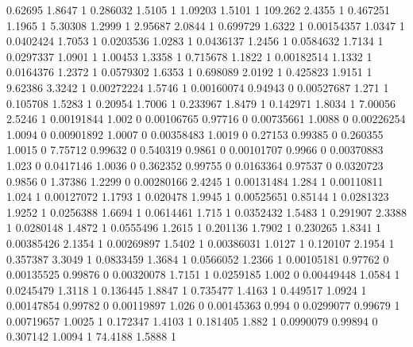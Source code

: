 {0.62695 1.8647 1
0.286032 1.5105 1
1.09203 1.5101 1
109.262 2.4355 1
0.467251 1.1965 1
5.30308 1.2999 1
2.95687 2.0844 1
0.699729 1.6322 1
0.00154357 1.0347 1
0.0402424 1.7053 1
0.0203536 1.0283 1
0.0436137 1.2456 1
0.0584632 1.7134 1
0.0297337 1.0901 1
1.00453 1.3358 1
0.715678 1.1822 1
0.00182514 1.1332 1
0.0164376 1.2372 1
0.0579302 1.6353 1
0.698089 2.0192 1
0.425823 1.9151 1
9.62386 3.3242 1
0.00272224 1.5746 1
0.00160074 0.94943 0
0.00527687 1.271 1
0.105708 1.5283 1
0.20954 1.7006 1
0.233967 1.8479 1
0.142971 1.8034 1
7.00056 2.5246 1
0.00191844 1.002 0
0.00106765 0.97716 0
0.00735661 1.0088 0
0.00226254 1.0094 0
0.00901892 1.0007 0
0.00358483 1.0019 0
0.27153 0.99385 0
0.260355 1.0015 0
7.75712 0.99632 0
0.540319 0.9861 0
0.00101707 0.9966 0
0.00370883 1.023 0
0.0417146 1.0036 0
0.362352 0.99755 0
0.0163364 0.97537 0
0.0320723 0.9856 0
1.37386 1.2299 0
0.00280166 2.4245 1
0.00131484 1.284 1
0.00110811 1.024 1
0.00127072 1.1793 1
0.020478 1.9945 1
0.00525651 0.85144 1
0.0281323 1.9252 1
0.0256388 1.6694 1
0.0614461 1.715 1
0.0352432 1.5483 1
0.291907 2.3388 1
0.0280148 1.4872 1
0.0555496 1.2615 1
0.201136 1.7902 1
0.230265 1.8341 1
0.00385426 2.1354 1
0.00269897 1.5402 1
0.00386031 1.0127 1
0.120107 2.1954 1
0.357387 3.3049 1
0.0833459 1.3684 1
0.0566052 1.2366 1
0.00105181 0.97762 0
0.00135525 0.99876 0
0.00320078 1.7151 1
0.0259185 1.002 0
0.00449448 1.0584 1
0.0245479 1.3118 1
0.136445 1.8847 1
0.735477 1.4163 1
0.449517 1.0924 1
0.00147854 0.99782 0
0.00119897 1.026 0
0.00145363 0.994 0
0.0299077 0.99679 1
0.00719657 1.0025 1
0.172347 1.4103 1
0.181405 1.882 1
0.0990079 0.99894 0
0.307142 1.0094 1
74.4188 1.5888 1
}\dadosdispersao

